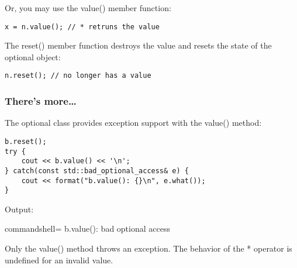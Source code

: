 Or, you may use the value() member function:

\begin{lstlisting}[style=styleCXX]
x = n.value(); // * retruns the value
\end{lstlisting}

The reset() member function destroys the value and resets the state of the optional object:

\begin{lstlisting}[style=styleCXX]
n.reset(); // no longer has a value
\end{lstlisting}


\subsubsection{There's more…}

The optional class provides exception support with the value() method:

\begin{lstlisting}[style=styleCXX]
b.reset();
try {
	cout << b.value() << '\n';
} catch(const std::bad_optional_access& e) {
	cout << format("b.value(): {}\n", e.what());
}
\end{lstlisting}

Output:

\begin{tcblisting}{commandshell={}}
b.value(): bad optional access
\end{tcblisting}

\begin{tcolorbox}[colback=webgreen!5!white,colframe=webgreen!75!black,title=Note]
Only the value() method throws an exception. The behavior of the * operator is undefined for an invalid value.
\end{tcolorbox}







